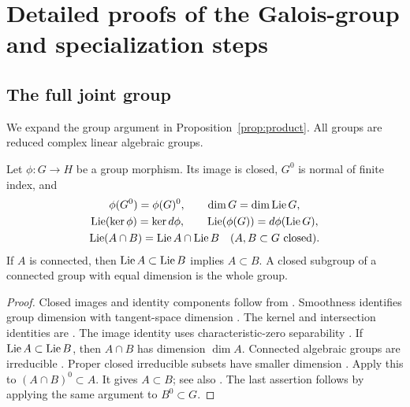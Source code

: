\section{Detailed proofs of the Galois-group and specialization steps}
\label{app:detailed-proofs}

\subsection{The full joint group}\label{app:joint-group}
We expand the group argument in Proposition~\ref{prop:product}.
All groups are reduced complex linear algebraic groups.

\begin{lemma}\label{lem:app-group-interface}
Let $\phi:G\to H$ be a group morphism.
Its image is closed, $G^0$ is normal of finite index, and
\begin{equation}\label{eq:app-group-interface}
\begin{gathered}
 \phi(G^0)=\phi(G)^0,\qquad \dim G=\dim\operatorname{Lie} G,\\
 \operatorname{Lie}(\ker\phi)=\ker d\phi,\qquad
 \operatorname{Lie}(\phi(G))=d\phi(\operatorname{Lie} G),\\
 \operatorname{Lie}(A\cap B)=\operatorname{Lie} A\cap\operatorname{Lie} B
 \quad(A,B\subset G\text{ closed}).
\end{gathered}
\end{equation}
If $A$ is connected, then $\operatorname{Lie} A\subset\operatorname{Lie} B$ implies $A\subset B$.
A closed subgroup of a connected group with equal dimension is the whole group.
\end{lemma}
\begin{proof}
Closed images and identity components follow from
\cite[Proposition~1.2(b), p.~46; Corollary~1.4(a)--(b), p.~47]{Borel1991}.
Smoothness identifies group dimension with tangent-space dimension
\cite[Proposition~1.2(a), p.~46]{Borel1991}
\cite[\S9.1, p.~65]{Humphreys1975}.
The kernel and intersection identities are
\cite[\S12.5, Theorem, p.~85]{Humphreys1975}.
The image identity uses characteristic-zero separability
\cite[\S7.2, proof, p.~105]{Borel1991}.
If $\operatorname{Lie} A\subset\operatorname{Lie} B$, then $A\cap B$ has dimension $\dim A$.
Connected algebraic groups are irreducible
\cite[Proposition~1.2 and following paragraph, \mbox{pp.}~46--47]{Borel1991}.
Proper closed irreducible subsets have smaller dimension
\cite[\S3.2, Proposition, p.~25]{Humphreys1975}.
Apply this to $(A\cap B)^0\subset A$.
It gives $A\subset B$; see also
\cite[\S7.1(2), p.~105]{Borel1991}
\cite[\S13.1, Theorem, p.~87]{Humphreys1975}.
The last assertion follows by applying the same argument to $B^0\subset G$.
\end{proof}


